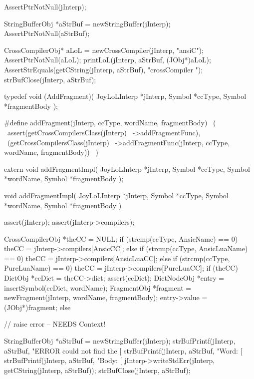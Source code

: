 \startCTest
  AssertPtrNotNull(jInterp);

  StringBufferObj *aStrBuf = newStringBuffer(jInterp);
  AssertPtrNotNull(aStrBuf);

  CrossCompilerObj* aLoL =
    newCrossCompiler(jInterp, "ansiC");
  AssertPtrNotNull(aLoL);
  printLoL(jInterp, aStrBuf, (JObj*)aLoL);
  AssertStrEquals(getCString(jInterp, aStrBuf), "crossCompiler ");
  strBufClose(jInterp, aStrBuf);
\stopCTest
\stopTestCase

\stopTestSuite

\startTestSuite[addFragment]

\startCHeader
typedef void (AddFragment)(
  JoyLoLInterp *jInterp,
  Symbol       *ccType,
  Symbol       *fragmentBody
);

#define addFragment(jInterp, ccType, wordName, fragmentBody)      \
  (                                                               \
    assert(getCrossCompilersClass(jInterp)                        \
      ->addFragmentFunc),                                         \
    (getCrossCompilersClass(jInterp)                              \
      ->addFragmentFunc(jInterp, ccType, wordName, fragmentBody)) \
  )
\stopCHeader

\setCHeaderStream{private}
\startCHeader
extern void addFragmentImpl(
  JoyLoLInterp *jInterp,
  Symbol       *ccType,
  Symbol       *wordName,
  Symbol       *fragmentBody
);
\stopCHeader
\setCHeaderStream{public}

\startCCode
void addFragmentImpl(
  JoyLoLInterp *jInterp,
  Symbol       *ccType,
  Symbol       *wordName,
  Symbol       *fragmentBody
) {
  assert(jInterp);
  assert(jInterp->compilers);

  CrossCompilerObj *theCC = NULL;
  if (strcmp(ccType, AnsicName) == 0) {
    theCC = jInterp->compilers[AnsicCC];
  } else if (strcmp(ccType, AnsicLuaName) == 0) {
    theCC = jInterp->compilers[AnsicLuaCC];
  } else if (strcmp(ccType, PureLuaName) == 0) {
    theCC = jInterp->compilers[PureLuaCC];
  }
  if (theCC) {
    DictObj *ccDict = theCC->dict;
    assert(ccDict);
    DictNodeObj *entry    = insertSymbol(ccDict, wordName);
    FragmentObj *fragment =
      newFragment(jInterp, wordName, fragmentBody);
    entry->value = (JObj*)fragment;
  } else {
    // raise error -- NEEDS Context!
    
    StringBufferObj *aStrBuf = newStringBuffer(jInterp);
    strBufPrintf(jInterp, aStrBuf, 
      "ERROR could not find the [%
    strBufPrintf(jInterp, aStrBuf, "Word: [%
    strBufPrintf(jInterp, aStrBuf, "Body: [%
    jInterp->writeStdErr(jInterp, getCString(jInterp, aStrBuf));
    strBufClose(jInterp, aStrBuf);
  }
}

